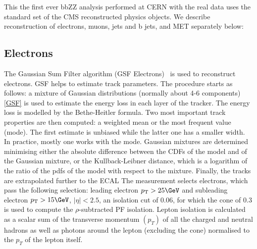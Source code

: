 This the first ever bbZZ analysis performed at CERN with the real data uses the standard set of the CMS
reconstructed physics objects. We describe reconstruction of
electrons, muons, jets and b jets, and MET separately below:



\subsection{Electrons\label{sec:electrons}}
The Gaussian Sum Filter algorithm (GSF
Electrons)~\cite{Khachatryan:2015hwa} is used to reconstruct
electrons. GSF helps to estimate track parameters. The procedure starts as follows: a mixture of Gaussian distributions (normally about 4-6 components) \ref{GSF} is used to estimate the energy loss in each layer of the tracker. The energy loss is modelled by the Bethe-Heitler formula. Two most important track properties are then computed: a weighted mean or the most frequent value (mode). The first estimate is unbiased while the latter one has a smaller width. In practice, mostly one works with the mode. Gaussian mixtures are determined minimising either the absolute difference between the CDFs of the model and of the Gaussian mixture, or the Kullback-Leibner distance, which is a logarithm of the ratio of the pdfs of the model with respect to the mixture. Finally, the tracks are extrapolated further to the ECAL The measurement selects electrons, which pass the following selection:
leading electron $\pt>25\GeV$ and subleading electron $\pt>15\GeV$, $|\eta|<2.5$, 
an isolation cut of 0.06, for which the cone
of $0.3$ is used to compute the $\rho$-subtracted PF
isolation. Lepton isolation is calculated as a scalar sum of
the transverse momentum $(p_{T})$ of all the charged and
neutral hadrons as well as photons around the lepton
(excluding the cone) normalised to the $p_{T}$ of the lepton
itself. 

        

